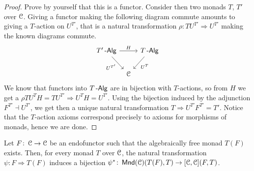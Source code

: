 \documentclass[a4paper,11pt,oneside,openany]{scrbook}
\begin{document}
\begin{proof}
	Prove by yourself that this is a functor. Consider then two monads $T$, $T'$
    over $\operatorname{\mathcal{C}}$. Giving a functor making the following diagram commute amounts to
    giving a $T$-action on $U^{T'}$, that is a natural transformation
    $\rho\colon TU^{T'}\Rightarrow U^{T'}$ making the known diagrams commute.
	\[
		\begin{tikzcd}[column sep=tiny]
			T'\Alg\ar[rr, "H"]\ar[dr, swap, "U^{T'}"]
			&& T\Alg\ar[dl, "U^T"] \\
			& \C
		\end{tikzcd}
	\]
	We know that functors into $T\operatorname{-\mathsf{Alg}}$ are in bijection with $T$-actions, so
    from $H$ we get a $\rho TU^TH=TU^{T'}\Rightarrow U^TH=U^{T'}$. Using
    the bijection induced by the adjunction $F^{T'}\dashv U^{T'}$, we get then a unique natural
    transformation $T\Rightarrow U^{T'}F^{T'}=T'$. Notice that the
    $T$-action axioms correspond precisely to axioms for morphisms of
    monads, hence we are done.
\end{proof}

\begin{prop}
	Let $F\colon\operatorname{\mathcal{C}}\rightarrow\operatorname{\mathcal{C}}$ be an endofunctor such that the algebraically
    free monad $T(F)$ exists. Then, for every monad $T$ over $\operatorname{\mathcal{C}}$, the natural
    transformation $\psi\colon F\Rightarrow T(F)$ induces a bijection
    $\psi^*\colon\operatorname{\mathsf{Mnd}}(\operatorname{\mathcal{C}})(T(F),T)\rightarrow [\operatorname{\mathcal{C}},\operatorname{\mathcal{C}}](F,T)$.
\end{prop}
\end{document}
